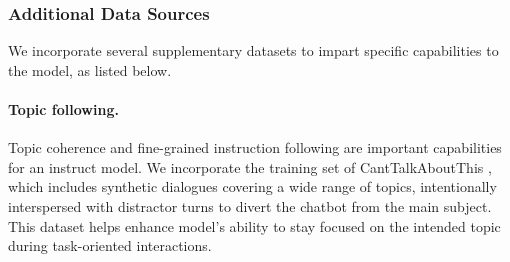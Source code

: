 \documentclass[11pt]{article}
\newcommand{\ssy}[1]{{\color{blue}{[Shengyang: #1]}}}
\begin{document}



\subsubsection{Additional Data Sources}
We incorporate several supplementary datasets to impart specific capabilities to the model, as listed below.
\paragraph{Topic following.}
Topic coherence and fine-grained instruction following are important capabilities for an instruct model. We incorporate the training set of CantTalkAboutThis \citep{topic_following_dataset}, which includes synthetic dialogues covering a wide range of topics, intentionally interspersed with distractor turns to divert the chatbot from the main subject. This dataset helps enhance model's ability to stay focused on the intended topic during task-oriented interactions.
\end{document}
